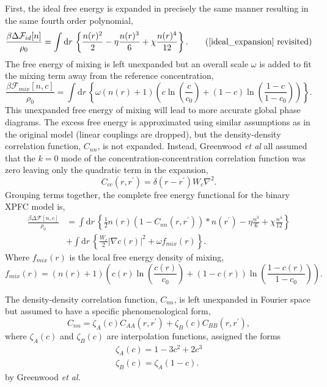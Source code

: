 \documentclass[showkeys, prb, reprint]{revtex4-1}
\renewcommand{\d}{\delta}       %
\newcommand{\F}{\mathcal{F}}    %
\renewcommand{\l}{\left}        %
\renewcommand{\r}{\right}       %
\newcommand{\f}{\frac}          %
\newcommand{\integrate}[1]{\int \mathrm{d}#1\,}
\begin{document}
First, the ideal free energy is expanded in precisely the same manner resulting
in the same fourth order polynomial,
%
\begin{equation}
    \f{\beta\Delta\F_{id}[n]}{\rho_0} = \integrate{r}
        \l\lbrace \f{n(r)^2}{2} - \eta \f{n(r)^3}{6} + \chi\f{n(r)^4}{12}
        \r\rbrace. \tag{\ref{ideal_expansion} revisited}
\end{equation}
%
The free energy of mixing is left unexpanded but an overall scale $\omega$ is
added to fit the mixing term away from the reference concentration,
%
\begin{equation}
    \f{\beta\F_{mix}[n, c]}{\rho_0} =
        \integrate{r} \l\lbrace \omega (n(r) + 1)\l( 
            c\ln\l(\f{c}{c_0}\r) + (1-c)\ln\l(\f{1-c}{1-c_0}\r) \r)\r\rbrace. 
\end{equation}
%
This unexpanded free energy of mixing will lead to more accurate global phase
diagrams. The excess free energy is approximated using similar assumptions as
in the original model (linear couplings are dropped), but the density-density
correlation function, $C_{nn}$, is not expanded. Instead, Greenwood \textit{et
al} all assumed that the $k=0$ mode of the concentration-concentration
correlation function was zero leaving only the quadratic term in the expansion,
%
\begin{equation}
    C_{cc}(r, r^\prime) = \d(r - r^\prime)W_c \nabla^2.
\end{equation}
%
Grouping terms together, the complete free energy functional for the binary
XPFC model is,
%
\begin{align}
    \f{\beta\Delta\F[n, c]}{\rho_0} &= \integrate{r} \l\lbrace
        \f{1}{2} n(r) \l(1 - C_{nn}(r, r^\prime)\r) \ast n(r^\prime)
        - \eta \f{n^3}{6} + \chi \f{n^4}{12} \r\rbrace \\
        &+ \integrate{r}\l\lbrace
            \f{W_c}{2}\l\vert \nabla c(r) \r\vert^2 + \omega f_{mix}(r)
            \r\rbrace. \nonumber
\end{align}
%
Where $f_{mix}(r)$ is the local free energy density of mixing,
%
\begin{equation}
    f_{mix}(r) = \l(n(r) + 1\r)\l( 
            c(r)\ln\l(\f{c(r)}{c_0}\r) + (1-c(r))\ln\l(\f{1-c(r)}{1-c_0}\r) \r).
\end{equation}
%

The density-density correlation function, $C_{nn}$, is left unexpanded in 
Fourier space but assumed to have a specific phenomenological form,
%
\begin{equation}
    \label{eq:xpfc_corr}
    C_{nn} = \zeta_A(c) C_{AA}(r, r^\prime) 
           + \zeta_B(c) C_{BB}(r, r^\prime),
\end{equation}
%
where $\zeta_A(c)$ and $\zeta_B(c)$ are interpolation functions, assigned the forms
%
\begin{gather}
    \zeta_A(c) = 1 - 3c^2 + 2c^3 \\
    \zeta_B(c) = \zeta_A(1 - c).
\end{gather}
%
by Greenwood \textit{et al.}
\end{document}
